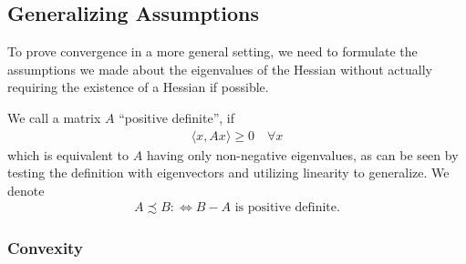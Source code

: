 \subsection{Generalizing Assumptions}

To prove convergence in a more general setting, we need to formulate the assumptions
we made about the eigenvalues of the Hessian without actually requiring
the existence of a Hessian if possible. 
\begin{definition}
	We call a matrix \(A\) ``positive definite'', if
	\begin{align*}
		\langle x, Ax \rangle \ge 0 \quad \forall x
	\end{align*}
	which is equivalent to \(A\) having only non-negative eigenvalues, as can be seen
	by testing the definition with eigenvectors and utilizing linearity to generalize.
	We denote
	\begin{align*}
		A \precsim B :\iff B-A \text{ is positive definite}.
	\end{align*}
\end{definition}

\subsubsection{Convexity}


